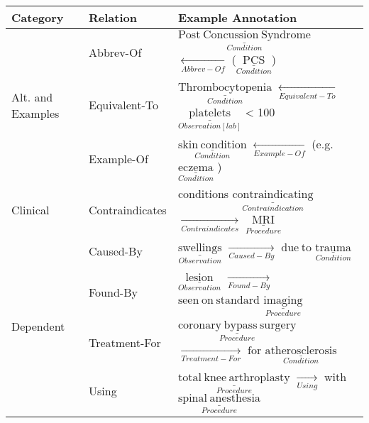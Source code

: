\begin{tabular}{m{3.8cm} m{2.2cm} m{10cm}}
\toprule
    \textbf{Category} & \textbf{Relation} & \textbf{Example Annotation} \\ \midrule
    
     & Abbrev-Of     & $\underset{Condition}{\underline{\mathrm{Post\ Concussion\ Syndrome}}}$ \quad $\xleftarrow[Abbrev-Of]{}$ \quad ($\underset{Condition}{\underline{\mathrm{PCS}}}$) \\
        
    Alt. and Examples & Equivalent-To & $\underset{Condition}{\underline{\mathrm{Thrombocytopenia}}}$ \quad $\xleftarrow[Equivalent-To]{}$ \quad $\underset{Observation[lab]}{\underline{\mathrm{platelets}}}$ \quad < 100 \\
    
     & Example-Of    & $\underset{Condition}{\underline{\mathrm{skin\ condition}}}$ \quad $\xleftarrow[Example-Of]{}$ \quad (e.g. \quad $\underset{Condition}{\underline{\mathrm{eczema}}}$ ) \\[2ex] 
     
    \hline
     
     Clinical & Contraindicates & conditions \quad  $\underset{Contraindication}{\underline{\mathrm{contraindicating}}}$ \quad $\xrightarrow[Contraindicates]{}$ \quad $\underset{Procedure}{\underline{\mathrm{MRI}}}$ \\[2ex] 
    
    \hline
    
    \multirow{4}{*}[-13pt]{\mbox{Dependent}} &
        Caused-By     & $\underset{Observation}{\underline{\mathrm{swellings}}}$ \quad $\xrightarrow[Caused-By]{}$ \quad $\mathrm{due\ to}$ \quad $\underset{Condition}{\underline{\mathrm{trauma}}}$ \\    
        
     & Found-By      & $\underset{Observation}{\underline{\mathrm{lesion}}}$ \quad $\xrightarrow[Found-By]{}$ \quad $\mathrm{seen\ on\ standard}$ \quad $\underset{Procedure}{\underline{\mathrm{imaging}}}$ \\
    
     & Treatment-For & $\underset{Procedure}{\underline{\mathrm{coronary\ bypass\ surgery}}}$ \quad $\xrightarrow[Treatment-For]{}$ \quad $\mathrm{for}$ \quad $\underset{Condition}{\underline{\mathrm{atherosclerosis}}}$ \\
    
     & Using         & $\underset{Procedure}{\underline{\mathrm{total\ knee\ arthroplasty}}}$ \quad $\xrightarrow[Using]{}$ \quad $\mathrm{with}$ \quad  $\underset{Procedure}{\underline{\mathrm{spinal\ anesthesia}}}$ \\[2ex]
    

\end{tabular}
